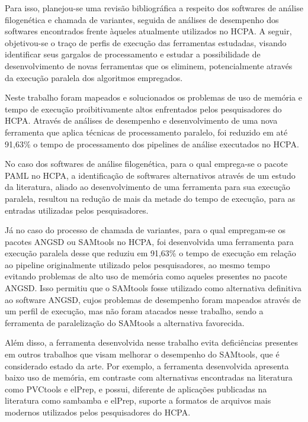 \documentclass[cic,tc]{iiufrgs}
\begin{document}
Para isso, planejou-se uma revisão bibliográfica a respeito dos softwares de
análise filogenética e chamada de variantes, seguida de análises de desempenho
dos softwares encontrados frente àqueles atualmente utilizados no HCPA. A
seguir, objetivou-se o traço de perfis de execução das ferramentas estudadas,
visando identificar seus gargalos de processamento e estudar a possibilidade de
desenvolvimento de novas ferramentas que os eliminem, potencialmente através da
execução paralela dos algoritmos empregados.

%
%
Neste trabalho foram mapeados e solucionados os problemas de uso de memória e
tempo de execução proibitivamente altos enfrentados pelos pesquisadores do HCPA.
Através de análises de desempenho e desenvolvimento de uma nova ferramenta que
aplica técnicas de processamento paralelo, foi reduzido em até 91,63\% o tempo
de processamento dos pipelines de análise executados no HCPA.

No caso dos softwares de análise filogenética, para o qual emprega-se o pacote
PAML no HCPA, a identificação de softwares alternativos através de um estudo da
literatura, aliado ao desenvolvimento de uma ferramenta para sua execução
paralela, resultou na redução de mais da metade do tempo de execução, para as
entradas utilizadas pelos pesquisadores.

Já no caso do processo de chamada de variantes, para o qual empregam-se os
pacotes ANGSD ou SAMtools no HCPA, foi desenvolvida uma ferramenta para
execução paralela desse que reduziu em 91,63\% o tempo de execução em relação
ao pipeline originalmente utilizado pelos pesquisadores, ao mesmo tempo
evitando problemas de alto uso de memória como aqueles presentes no pacote
ANGSD. Isso permitiu que o SAMtools fosse utilizado como alternativa definitiva
ao software ANGSD, cujos problemas de desempenho foram mapeados através de um
perfil de execução, mas não foram atacados nesse trabalho, sendo a ferramenta
de paralelização do SAMtools a alternativa favorecida.

Além disso, a ferramenta desenvolvida nesse trabalho evita deficiências
presentes em outros trabalhos que visam melhorar o desempenho do SAMtools, que
é considerado estado da arte. Por exemplo, a ferramenta desenvolvida apresenta
baixo uso de memória, em contraste com alternativas encontradas na literatura
como PVCtools e elPrep, e possui, diferente de aplicações publicadas na
literatura como sambamba e elPrep, suporte a formatos de arquivos mais modernos
utilizados pelos pesquisadores do HCPA.
\end{document}
